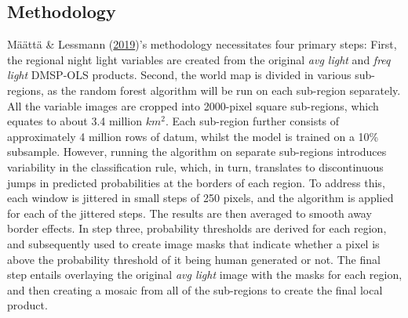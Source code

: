 \documentclass[11pt,preprint, authoryear]{elsarticle}
\numberwithin{equation}{section}
\numberwithin{figure}{section}
\numberwithin{table}{section}
\begin{document}
\hypertarget{methodology}{%
\subsection*{Methodology}\label{methodology}}

Määttä \& Lessmann (\protect\hyperlink{ref-maatta}{2019})'s methodology
necessitates four primary steps: First, the regional night light
variables are created from the original \emph{avg light} and \emph{freq
light} DMSP-OLS products. Second, the world map is divided in various
sub-regions, as the random forest algorithm will be run on each
sub-region separately. All the variable images are cropped into
2000-pixel square sub-regions, which equates to about 3.4 million
\(km^2\). Each sub-region further consists of approximately 4 million
rows of datum, whilst the model is trained on a 10\% subsample. However,
running the algorithm on separate sub-regions introduces variability in
the classification rule, which, in turn, translates to discontinuous
jumps in predicted probabilities at the borders of each region. To
address this, each window is jittered in small steps of 250 pixels, and
the algorithm is applied for each of the jittered steps. The results are
then averaged to smooth away border effects. In step three, probability
thresholds are derived for each region, and subsequently used to create
image masks that indicate whether a pixel is above the probability
threshold of it being human generated or not. The final step entails
overlaying the original \emph{avg light} image with the masks for each
region, and then creating a mosaic from all of the sub-regions to create
the final local product.
\end{document}
